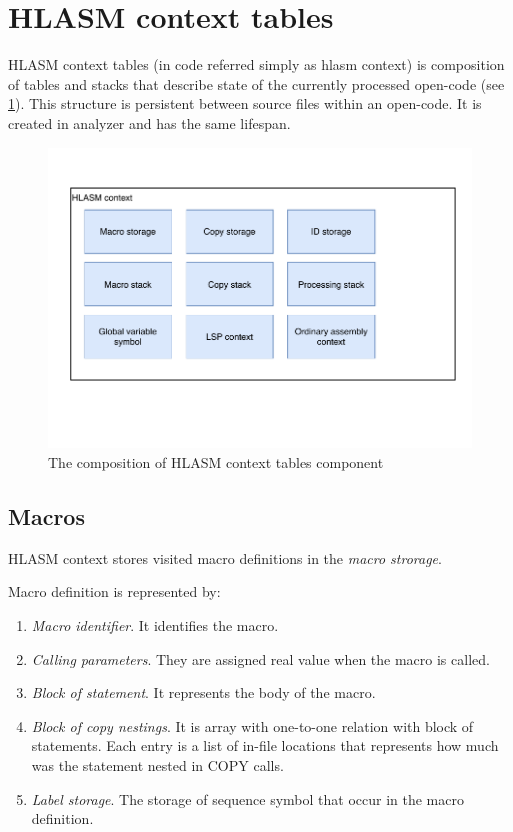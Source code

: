 \section{HLASM context tables}

HLASM context tables (in code referred simply as hlasm context) is composition of tables and stacks that describe state of the currently processed open-code (see \cref{fig06:hlasm}). This structure is persistent between source files within an open-code. It is created in analyzer and has the same lifespan. 

\begin{figure}
	\centering
	\includegraphics[width=\textwidth / 2]{img/hlasm_arch}
	\caption{The composition of HLASM context tables component}
	\label{fig06:hlasm}
\end{figure}

\subsection{Macros}

HLASM context stores visited macro definitions in the \emph{macro strorage}. 

Macro definition is represented by:
\begin{enumerate}
	\item \emph{Macro identifier}. It identifies the macro.
	\item \emph{Calling parameters}. They are assigned real value when the macro is called.
	\item \emph{Block of statement}. It represents the body of the macro.
	\item \emph{Block of copy nestings}. It is array with one-to-one relation with block of statements. Each entry is a list of in-file locations that represents how much was the statement nested in COPY calls.
	\item \emph{Label storage}. The storage of sequence symbol that occur in the macro definition.
\end{enumerate}

